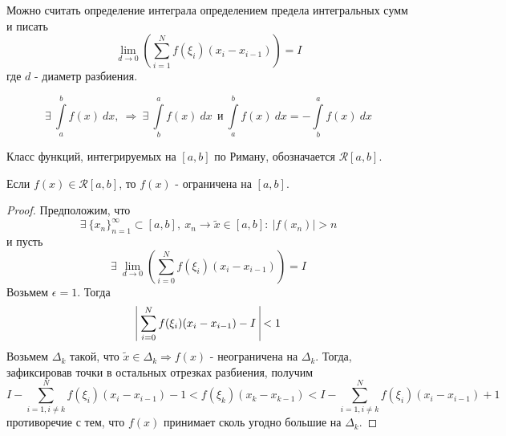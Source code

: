 \begin{comm}
    Можно считать определение интеграла определением предела интегральных сумм и писать
    \[\lim\limits_{d\to 0}\left(\sum\limits_{i=1}^{N}f(\xi_i)(x_i-x_{i-1})\right)=I\]
    где $d$ - диаметр разбиения.
\end{comm} 
\begin{statement}
    \[\exists\ \int\limits_{a}^{b}f(x)\ dx,\ \Rightarrow \ \exists\ \int\limits_{b}^{a}f(x)\ dx\ \ \text{и}\ \int\limits_{a}^{b}f(x)\ dx=-\int\limits_{b}^{a}f(x)\ dx\]
\end{statement} 
\begin{definition}
    Класс функций, интегрируемых на $[a,b]$ по Риману, обозначается $\mathcal{R}[a,b]$.
\end{definition} 
\begin{theorem}
    Если $f(x)\in \mathcal{R}[a,b]$, то $f(x)$ - ограничена на $[a,b]$.
\end{theorem} 
\begin{proof}
    Предположим, что 
    \[\exists\ \{x_n\}_{n=1}^{\infty}\subset [a,b],\ x_n\to\widetilde{x}\in [a,b]:\ |f(x_n)|>n\]
    и пусть
    \[\exists\ \lim\limits_{d\to 0}\left( \sum\limits_{i=0}^{N}f(\xi_i)(x_i-x_{i-1}) \right)=I\] 
    Возьмем $\epsilon=1$. Тогда  
    \[\vline\ \sum\limits_{i=0}^{N}f(\xi_i)(x_i-x_{i-1})-I\ \vline<1\]
    Возьмем $\Delta_k$ такой, что $\widetilde{x}\in \Delta_k \Rightarrow f(x)$ - неограничена на $\Delta_k$. Тогда, зафиксировав точки в остальных отрезках разбиения, получим
    \[I-\sum\limits_{i=1,i\ne k}^{N} f(\xi_i)(x_i-x_{i-1})-1<f(\xi_k)(x_k-x_{k-1})<I-\sum\limits_{i=1,i\ne k}^{N} f(\xi_i)(x_i-x_{i-1})+1\]
    противоречие с тем, что $f(x)$ принимает сколь угодно большие  на $\Delta_k$.
\end{proof} 

